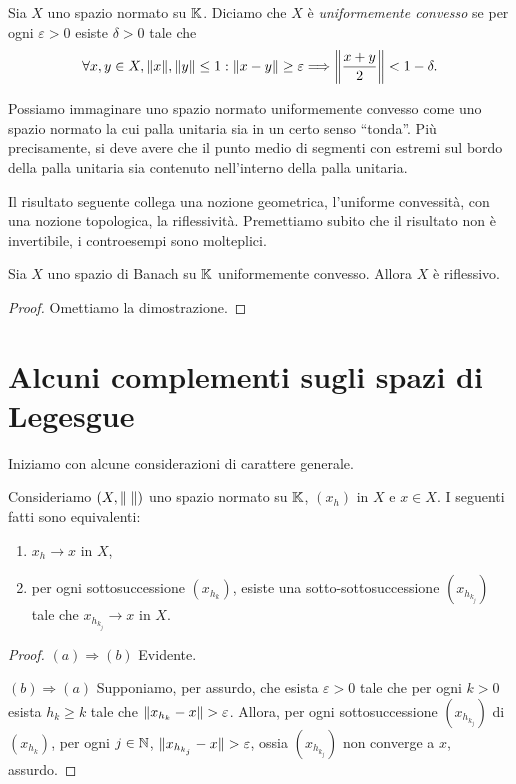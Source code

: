 \begin{definizione}
	Sia $X$ uno spazio normato su $\K$. Diciamo che $X$ è \emph{uniformemente convesso} se per ogni $\varepsilon > 0$ esiste $\delta >0$ tale che
	\[ \forall x,y \in X, \norm{x},\norm{y} \le 1 : \norm{x-y} \ge \varepsilon \Longrightarrow \norm*{\frac{x+y}{2}}  < 1-\delta.\]
\end{definizione}
Possiamo immaginare uno spazio normato uniformemente convesso come uno spazio normato la cui palla unitaria sia in un certo senso ``tonda''. Più precisamente, si deve avere che il punto medio di segmenti con estremi sul bordo della palla unitaria sia contenuto nell'interno della palla unitaria.

Il risultato seguente collega una nozione geometrica, l'uniforme convessità, con una nozione topologica, la riflessività. Premettiamo subito che il risultato non è invertibile, i controesempi sono molteplici.
\begin{teorema}\label{uniconvrif}
	Sia $X$ uno spazio di Banach su $\K$ uniformemente convesso. Allora $X$ è riflessivo.
\end{teorema}
\begin{proof}
	Omettiamo la dimostrazione.
\end{proof}

\section{Alcuni complementi sugli spazi di Legesgue} 
Iniziamo con alcune considerazioni di carattere generale.
\begin{proposizione}
	Consideriamo $(X,\norm{\;})$ uno spazio normato su $\K$, $(x_h)$ in $X$ e $x \in X$. I seguenti fatti sono equivalenti:
	\begin{enumerate}[$(a)$]
		\item $x_h \to x$ in $X$,
		\item per ogni sottosuccessione $(x_{h_k})$, esiste una sotto-sottosuccessione $(x_{h_{k_j}})$ tale che $x_{h_{k_j}} \to x$ in $X$.
	\end{enumerate}
\end{proposizione}
\begin{proof}\hfill
	\par\noindent
	$(a) \Longrightarrow (b)$ Evidente.
	\par\noindent
	$(b) \Longrightarrow (a)$ Supponiamo, per assurdo, che esista $\varepsilon > 0$ tale che per ogni $k > 0$ esista $h_k \ge k$ tale che $\norm{x_{h_k}-x} > \varepsilon$. Allora, per ogni sottosuccessione $(x_{h_{k_j}})$ di $(x_{h_k})$, per ogni $j \in \N$, $\norm{x_{h_{k_j}}-x} > \varepsilon$, ossia $(x_{h_{k_j}})$ non converge a $x$, assurdo.
\end{proof}


